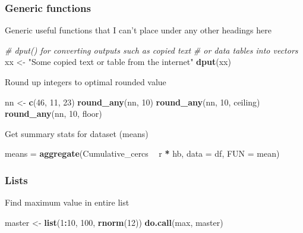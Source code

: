 \documentclass[10,portrait]{article}
\newenvironment{Shaded}{\begin{snugshade}}{\end{snugshade}}
\newcommand{\KeywordTok}[1]{\textcolor[rgb]{0.13,0.29,0.53}{\textbf{#1}}}
\newcommand{\DataTypeTok}[1]{\textcolor[rgb]{0.13,0.29,0.53}{#1}}
\newcommand{\DecValTok}[1]{\textcolor[rgb]{0.00,0.00,0.81}{#1}}
\newcommand{\StringTok}[1]{\textcolor[rgb]{0.31,0.60,0.02}{#1}}
\newcommand{\CommentTok}[1]{\textcolor[rgb]{0.56,0.35,0.01}{\textit{#1}}}
\newcommand{\OperatorTok}[1]{\textcolor[rgb]{0.81,0.36,0.00}{\textbf{#1}}}
\newcommand{\NormalTok}[1]{#1}
\begin{document}
\subsubsection{Generic functions}\label{generic-functions}

Generic useful functions that I can't place under any other headings
here

\begin{Shaded}
\begin{Highlighting}[]
\CommentTok{# dput() for converting outputs such as copied text}
\CommentTok{# or data tables into vectors}
\NormalTok{xx <-}\StringTok{ "Some copied text or table from the internet"}
\KeywordTok{dput}\NormalTok{(xx)}
\end{Highlighting}
\end{Shaded}

Round up integers to optimal rounded value

\begin{Shaded}
\begin{Highlighting}[]
\NormalTok{nn <-}\StringTok{ }\KeywordTok{c}\NormalTok{(}\DecValTok{46}\NormalTok{, }\DecValTok{11}\NormalTok{, }\DecValTok{23}\NormalTok{)}
\KeywordTok{round_any}\NormalTok{(nn, }\DecValTok{10}\NormalTok{)}
\KeywordTok{round_any}\NormalTok{(nn, }\DecValTok{10}\NormalTok{, ceiling)}
\KeywordTok{round_any}\NormalTok{(nn, }\DecValTok{10}\NormalTok{, floor)}
\end{Highlighting}
\end{Shaded}

Get summary stats for dataset (means)

\begin{Shaded}
\begin{Highlighting}[]
\NormalTok{means =}\StringTok{ }\KeywordTok{aggregate}\NormalTok{(Cumulative_cercs }\OperatorTok{~}\StringTok{ }\NormalTok{r }\OperatorTok{*}\StringTok{ }\NormalTok{hb, }\DataTypeTok{data =}\NormalTok{ df, }
    \DataTypeTok{FUN =}\NormalTok{ mean)}
\end{Highlighting}
\end{Shaded}

\subsubsection{Lists}\label{lists}

Find maximum value in entire list

\begin{Shaded}
\begin{Highlighting}[]
\NormalTok{master <-}\StringTok{ }\KeywordTok{list}\NormalTok{(}\DecValTok{1}\OperatorTok{:}\DecValTok{10}\NormalTok{, }\DecValTok{100}\NormalTok{, }\KeywordTok{rnorm}\NormalTok{(}\DecValTok{12}\NormalTok{))}
\KeywordTok{do.call}\NormalTok{(max, master)}
\end{Highlighting}
\end{Shaded}
\end{document}

